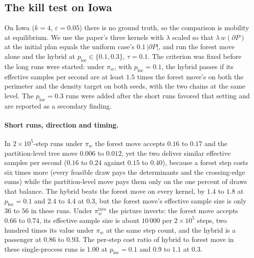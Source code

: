 \documentclass[11pt]{article}
\begin{document}
\subsection{The kill test on Iowa}\label{sec:exp-iowa}

On Iowa ($k = 4$, $\varepsilon = 0.05$) there is no ground truth, so
the comparison is mobility at equilibrium. We use the paper's three
kernels with $\lambda$ scaled so that $\lambda\, w(\partial P)$ at the
initial plan equals the uniform case's $0.1\,|\partial P|$, and run
the forest move alone and the hybrid at $p_{\mathrm{loc}} \in \{0.1,
0.3\}$, $\tau = 0.1$. The criterion was fixed before the long runs
were started: under $\pi_w$, with $p_{\mathrm{loc}} = 0.1$, the hybrid
passes if its effective samples per second are at least $1.5$ times
the forest move's on both the perimeter and the density target on
both seeds, with the two chains at the same level. The
$p_{\mathrm{loc}} = 0.3$ runs were added after the short runs favored
that setting and are reported as a secondary finding.

\paragraph{Short runs, direction and timing.} In $2 \times 10^5$-step
runs under $\pi_w$ the forest move accepts $0.16$ to $0.17$ and the
partition-level tree move $0.006$ to $0.012$, yet the two deliver
similar effective samples per second ($0.16$ to $0.24$ against $0.15$
to $0.40$), because a forest step costs six times more (every feasible
draw pays the determinants and the crossing-edge sums) while the
partition-level move pays them only on the one percent of draws that
balance. The hybrid beats the forest move on every kernel, by $1.4$ to
$1.8$ at $p_{\mathrm{loc}} = 0.1$ and $2.4$ to $4.4$ at $0.3$, but the
forest move's effective sample size is only $36$ to $56$ in these runs.
Under $\pi_w^{\mathrm{tree}}$ the picture inverts: the forest move
accepts $0.66$ to $0.74$, its effective sample size is about $10\,000$
per $2 \times 10^5$ steps, two hundred times its value under $\pi_w$
at the same step count, and the hybrid is a passenger at $0.86$ to
$0.93$. The per-step cost ratio of hybrid to forest move in these
single-process runs is $1.00$ at $p_{\mathrm{loc}} = 0.1$ and $0.9$ to
$1.1$ at $0.3$.
\end{document}
